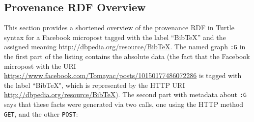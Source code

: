 \documentclass[conference]{IEEEtran}
\begin{document}
\subsection{Provenance RDF Overview}                                           \label{sec:appendix}
This section provides a shortened overview of the provenance RDF in Turtle syntax for a Facebook micropost tagged with the label ``BibTeX'' and the assigned
meaning \url{http://dbpedia.org/resource/BibTeX}. The named graph \texttt{:G} in the first part of the listing contains the absolute data (the fact that the Facebook micropost with the URI \url{https://www.facebook.com/Tomayac/posts/10150177486072286} is tagged with the label ``BibTeX", which is represented by the HTTP URI \url{http://dbpedia.org/resource/BibTeX}). The second part with metadata about \texttt{:G} says that these facts were generated via two calls, one using the HTTP method \texttt{GET}, and the other \texttt{POST}:
\end{document}
